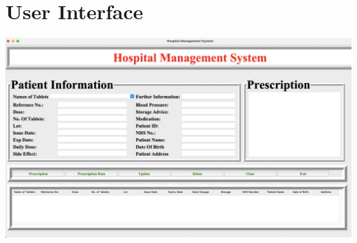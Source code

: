 \documentclass{article}
\begin{document}
\section{\textbf{User Interface}}
\begin{center}
    \includegraphics[scale = 0.35]{UI.png}
\end{center}
\end{document}
